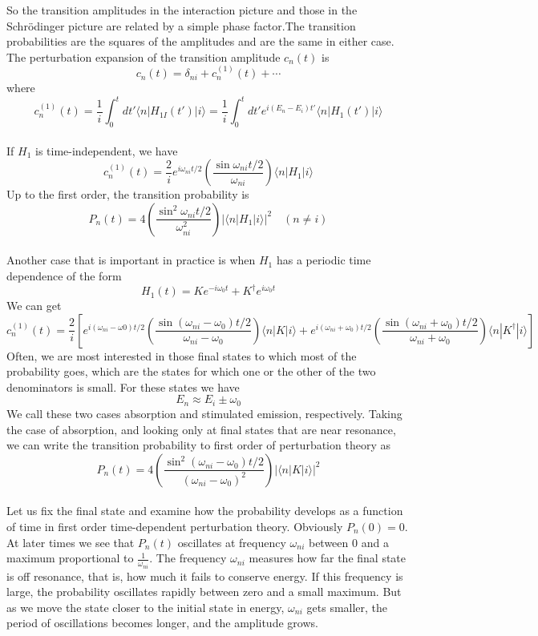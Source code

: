 So the transition amplitudes in the interaction picture and those in the Schrödinger picture are related by a simple phase factor.The transition probabilities are the squares of the amplitudes and are the same in either case. The perturbation expansion of the transition amplitude $c_n(t)$ is
\[c_n(t) = \delta_{ni} + c^{(1)}_n(t) + \cdots\]
where
\[c^{(1)}_n(t) = \frac{1}{i} \int_0^t dt' \langle n | H_{1I}(t')|i\rangle = \frac{1}{i} \int_0^t dt' e^{i(E_n-E_i)t'} \langle n | H_{1}(t')|i\rangle\]\\
If $H_1$ is time-independent, we have
\[c^{(1)}_n(t) = \frac{2}{i} e^{i\omega_{ni}t/2} \left( \frac{\sin\omega_{ni}t/2}{\omega_{ni}} \right) \langle n | H_1 | i \rangle\]
Up to the first order, the transition probability is
\[P_n(t) = 4 \left( \frac{\sin^2\omega_{ni}t/2}{\omega_{ni}^2} \right) |\langle n | H_1 | i \rangle|^2 \quad (n \neq i)\]\\
Another case that is important in practice is when $H_1$ has a periodic time dependence of the form
\[H_1(t) = Ke^{-i\omega_0t} + K^{\dagger}e^{i\omega_0t}\]
We can get
\[c^{(1)}_n(t) = \frac{2}{i} \left[ e^{i(\omega_{ni}-\omega0)t/2} \left( \frac{\sin(\omega_{ni}-\omega_0)t/2}{\omega_{ni}-\omega_0} \right) \langle n | K | i \rangle  + e^{i(\omega_{ni}+\omega_0)t/2} \left( \frac{\sin(\omega_{ni}+\omega_0)t/2}{\omega_{ni}+\omega_0} \right) \langle n | K^{\dagger} | i \rangle \right]  \]
Often, we are most interested in those final states to which most of the probability goes, which are the states for which one or the other of the two denominators is small.
For these states we have
\[E_n \approx E_i \pm \omega_0\]
We call these two cases absorption and stimulated emission, respectively. 
Taking the case of absorption, and looking only at final states that are near resonance, we can write the transition probability to first order of perturbation theory as
\[P_n(t) = 4 \left( \frac{\sin^2(\omega_{ni}-\omega_0)t/2}{(\omega_{ni}-\omega_0)^2} \right) |\langle n | K | i \rangle|^2\]\\
Let us fix the final state and examine how the probability develops as a function of time in first order time-dependent perturbation theory.
Obviously $P_n(0) = 0$. At later times we see that $P_n(t)$ oscillates at frequency $\omega_{ni}$ between $0$ and a maximum proportional to $\frac{1}{\omega_{ni}}$.
The frequency $\omega_{ni}$ measures how far the final state is off resonance, that is, how much it fails to conserve energy. If this frequency is large, the probability oscillates rapidly between zero and a small maximum. 
But as we move the state closer to the initial state in energy, $\omega_{ni}$ gets smaller, the period of oscillations becomes longer, and the amplitude grows.\\
